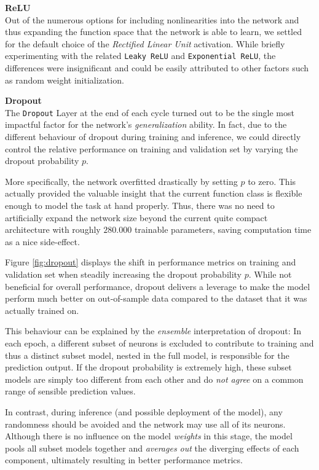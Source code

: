 \documentclass[12pt, letterpaper]{article}
\begin{document}
\textbf{ReLU} \\
Out of the numerous options for including nonlinearities into the network and thus expanding the function space that the network is able to learn, we settled for the default choice of the \emph{Rectified Linear Unit} activation.
While briefly experimenting with the related \texttt{Leaky ReLU} and \texttt{Exponential ReLU}, the differences were insignificant and could be easily attributed to other factors such as random weight initialization.

\textbf{Dropout} \\
The \texttt{Dropout} Layer at the end of each cycle turned out to be the single most impactful factor for the network's \emph{generalization} ability.
In fact, due to the different behaviour of dropout during training and inference, we could directly control the relative performance on training and validation set by varying the dropout probability $p$.

More specifically, the network overfitted drastically by setting $p$ to zero.
This actually provided the valuable insight that the current function class is flexible enough to model the task at hand properly.
Thus, there was no need to artificially expand the network size beyond the current quite compact architecture with roughly $280.000$ trainable parameters, saving computation time as a nice side-effect.

Figure \ref{fig:dropout} displays the shift in performance metrics on training and validation set when steadily increasing the dropout probability $p$.
While not beneficial for overall performance, dropout delivers a leverage to make the model perform much better on out-of-sample data compared to the dataset that it was actually trained on.

This behaviour can be explained by the \emph{ensemble} interpretation of dropout:
In each epoch, a different subset of neurons is excluded to contribute to training and thus a distinct subset model, nested in the full model, is responsible for the prediction output.
If the dropout probability is extremely high, these subset models are simply too different from each other and do \emph{not agree} on a common range of sensible prediction values.

In contrast, during inference (and possible deployment of the model), any randomness should be avoided and the network may use all of its neurons.
Although there is no influence on the model \emph{weights} in this stage, the model pools all subset models together and \emph{averages out} the diverging effects of each component, ultimately resulting in better performance metrics.
\end{document}
